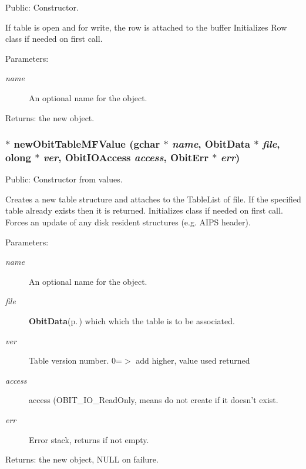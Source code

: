 Public: Constructor. 

If table is open and for write, the row is attached to the buffer Initializes Row class if needed on first call. \begin{Desc}
\item[Parameters:]
\begin{description}
\item[{\em name}]An optional name for the object. \end{description}
\end{Desc}
\begin{Desc}
\item[Returns:]the new object. \end{Desc}
\subsubsection{$\ast$ new\-Obit\-Table\-MFValue (gchar $\ast$ {\em name}, {\bf Obit\-Data} $\ast$ {\em file}, {\bf olong} $\ast$ {\em ver}, Obit\-IOAccess {\em access}, {\bf Obit\-Err} $\ast$ {\em err})}\label{ObitTableMF_8h_a12}


Public: Constructor from values. 

Creates a new table structure and attaches to the Table\-List of file. If the specified table already exists then it is returned. Initializes class if needed on first call. Forces an update of any disk resident structures (e.g. AIPS header). \begin{Desc}
\item[Parameters:]
\begin{description}
\item[{\em name}]An optional name for the object. \item[{\em file}]{\bf Obit\-Data}{\rm (p.\,\pageref{structObitData})} which which the table is to be associated. \item[{\em ver}]Table version number. 0=$>$ add higher, value used returned \item[{\em access}]access (OBIT\_\-IO\_\-Read\-Only, means do not create if it doesn't exist. \item[{\em err}]Error stack, returns if not empty. \end{description}
\end{Desc}
\begin{Desc}
\item[Returns:]the new object, NULL on failure. \end{Desc}
